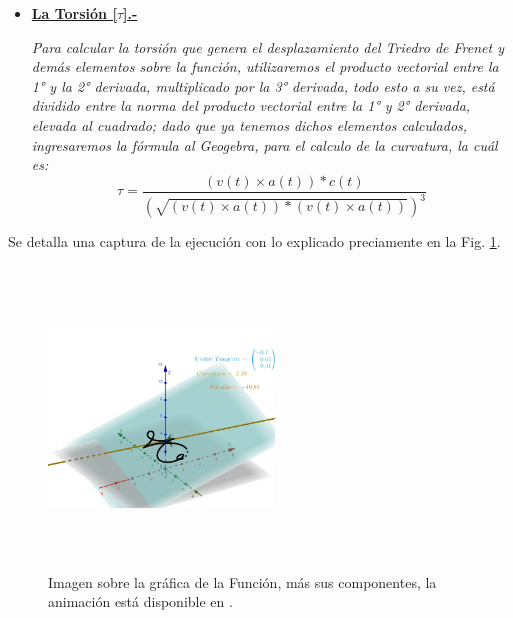 \documentclass[letterpaper, 11pt]{extarticle}
\begin{document}
\begin{itemize}
    \item{\textbf{\underline{\normalsize{La Torsión [$\tau$].-}}}}
        \begin{center}
            \textit{Para calcular la torsión que genera el desplazamiento del Triedro de Frenet y demás elementos sobre la función, utilizaremos el producto vectorial entre la 1° y la 2° derivada, multiplicado por la 3° derivada, todo esto a su vez, está dividido entre la norma del producto vectorial entre la 1° y 2° derivada, elevada al cuadrado; dado que ya tenemos dichos elementos calculados, ingresaremos la fórmula al Geogebra, para el calculo de la curvatura, la cuál es:}
            \begin{equation}
                \tau = \frac{(v(t) \times a(t)) * c(t)}{(\sqrt{(v(t) \times a(t)) * (v(t) \times a(t))})^{3}}
            \end{equation}
        \end{center}
\end{itemize}

Se detalla una captura de la ejecución con lo explicado preciamente en la Fig. \ref{fig:enter-label}.

\begin{figure}[b!]
    \centering
    \includegraphics[width=6cm, height=8cm]{"media/comp.jpg"}
    \caption{Imagen sobre la gráfica de la Función, más sus componentes, la animación está disponible en \citep{geo}.}
    \label{fig:enter-label}
\end{figure}

\newpage



\renewcommand{\refname}{Referencias}

\end{document}
